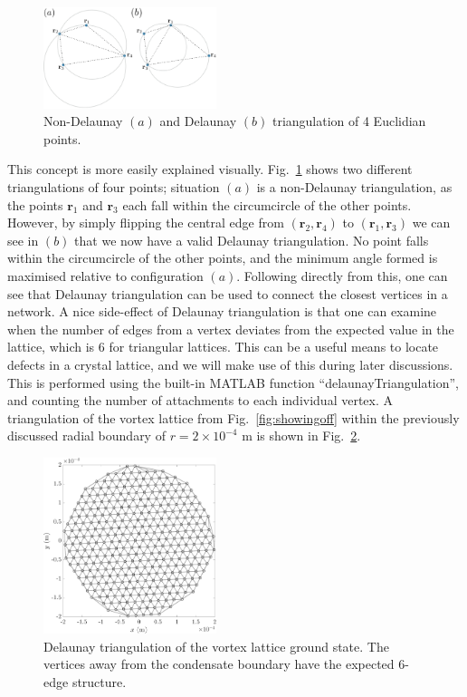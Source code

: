 \begin{figure}\centering
    \includegraphics[width=0.45\textwidth]{Images/ch4_vtx/deltri}
    \caption{Non-Delaunay $(a)$ and Delaunay $(b)$ triangulation of 4 Euclidian points.}\label{fig:delaun}
\end{figure}
This concept is more easily explained visually. Fig.~\ref{fig:delaun} shows two different triangulations of four points; situation $(a)$ is a non-Delaunay triangulation, as the points $\mathbf{r}_1$ and $\mathbf{r}_3$ each fall within the circumcircle of the other points. However, by simply flipping the central edge from $(\mathbf{r}_2, \mathbf{r}_4)$ to $(\mathbf{r}_1, \mathbf{r}_3)$ we can see in $(b)$ that we now have a valid Delaunay triangulation. No point falls within the circumcircle of the other points, and the minimum angle formed is maximised relative to configuration $(a)$. Following directly from this, one can see that Delaunay triangulation can be used to connect the closest vertices in a network. A nice side-effect of Delaunay triangulation is that one can examine when the number of edges from a vertex deviates from the expected value in the lattice, which is 6 for triangular lattices. This can be a useful means to locate defects in a crystal lattice, and we will make use of this during later discussions. This is performed using the built-in \textsc{MATLAB} function ``delaunayTriangulation'', and counting the number of attachments to each individual vertex. A triangulation of the vortex lattice from Fig.~\ref{fig:showingoff} within the previously discussed radial boundary of $r=2\times 10^{-4}$ m is shown in Fig.~\ref{fig:delaun_vtxlatt}.

\begin{figure}\centering
    \includegraphics[width=0.45\textwidth]{Images/ch4_vtx/Del_tr_VTXLATT}
    \caption{Delaunay triangulation of the vortex lattice ground state. The vertices away from the condensate boundary have the expected 6-edge structure.}\label{fig:delaun_vtxlatt}
\end{figure}

